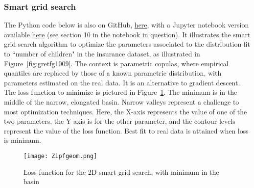\documentclass[oneside,10pt]{book}
\begin{document}
\subsubsection{Smart grid search}\label{smartgs}

The Python code below is also on GitHub, \href{https://github.com/VincentGranville/Statistical-Optimization/blob/main/ZetaGeom.py}{here},
 with a Jupyter notebook version available \href{https://github.com/VincentGranville/Notebooks/blob/main/copula_insurance_nogroup.ipynb}{here} (see section 10 in the notebook in question). It illustrates the smart grid search algorithm to optimize the parameters associated to the
 distribution fit to ``number of children" in the insurance dataset, as illustrated in Figure~\ref{fig:gretfg1009}. The context is parametric copulas,
 where empirical quantiles are replaced by those of a known parametric distribution, with parameters estimated on the real data. It is an alternative to gradient descent. The loss function to minimize is pictured in Figure~\ref{fig:gretddfaq}. The minimum is in the middle of the narrow, elongated basin. Narrow valleys represent a challenge to most optimization techniques. Here, the X-axis represents the value of one of the two parameters, the Y-axis is for the other parameter, and the contour levels represent the value of the loss function. Best fit to real data is attained when loss is minimum.

\begin{figure}[H]
\centering
\texttt{[image: Zipfgeom.png]}   
\caption{Loss function for the 2D smart grid search, with minimum in the basin}
\label{fig:gretddfaq}
\end{figure} 
\end{document}
